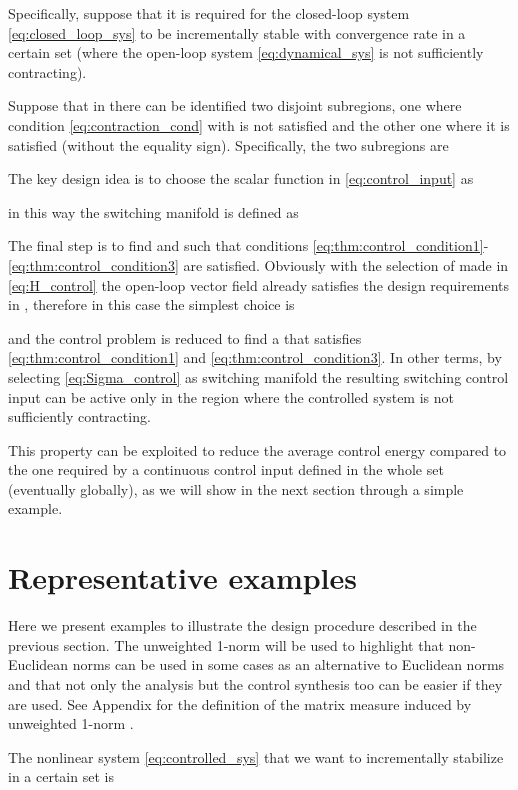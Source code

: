 \documentclass[letterpaper, 10 pt, conference]{ieeeconf}
\begin{document}
Specifically, suppose that it is required for the closed-loop system \eqref{eq:closed_loop_sys} to be incrementally stable with convergence rate  in a certain set  (where the open-loop system \eqref{eq:dynamical_sys} is not sufficiently contracting).

Suppose that in  there can be identified two disjoint subregions, one where condition \eqref{eq:contraction_cond} with  is not satisfied and the other one where it is satisfied (without the equality sign). Specifically, the two subregions are 


The key design idea is to choose the scalar function  in \eqref{eq:control_input} as

in this way the switching manifold  is defined as 




The final step is to find  and  such that conditions \eqref{eq:thm:control_condition1}-\eqref{eq:thm:control_condition3} are satisfied. Obviously with the selection of  made in \eqref{eq:H_control} the open-loop vector field  already satisfies the design requirements in , therefore in this case the simplest choice is 

and the control problem is reduced to find a  that satisfies \eqref{eq:thm:control_condition1} and \eqref{eq:thm:control_condition3}. In other terms, by selecting \eqref{eq:Sigma_control} as switching manifold the resulting switching control input can be active only in the region where the controlled system is not sufficiently contracting. 

This property can be exploited to reduce the average control energy compared to the one required by a continuous control input defined in the whole set  (eventually globally), as we will show in the next section through a simple example.

\section{Representative examples}
\label{sec:examples}

Here we present examples to illustrate the design procedure described in the previous section. The unweighted 1-norm will be used to highlight that non-Euclidean norms can be used in some cases as an alternative to Euclidean norms and that not only the analysis but the control synthesis too can be easier if they are used. See Appendix for the definition of the matrix measure induced by unweighted 1-norm .

The nonlinear system \eqref{eq:controlled_sys} that we want to incrementally stabilize in a certain set is 
\end{document}
